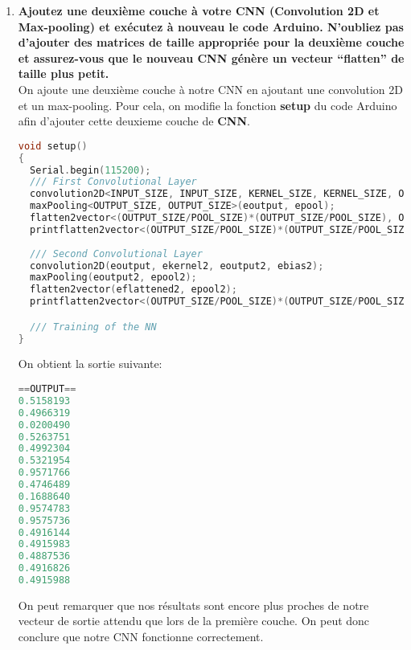 \begin{enumerate}
{\begin{lstlisting}[language=C]
0.4928572
0.5052462
0.4997209
    \end{lstlisting}
    On remarque imédiatement que l'on obtient des valeurs très proches de notre vecteur de sortie attendu. 
    On peut donc conclure que notre CNN fonctionne correctement.
  } \\
  \item {
    \textbf{Ajoutez une deuxième couche à votre CNN (Convolution 2D et Max-pooling) et
    exécutez à nouveau le code Arduino. N'oubliez pas d'ajouter des matrices de taille
    appropriée pour la deuxième couche et assurez-vous que le nouveau CNN génère un
    vecteur ``flatten'' de taille plus petit.} \vspace{0.2cm} \\
    On ajoute une deuxième couche à notre CNN en ajoutant une convolution 2D et un max-pooling. Pour cela,
    on modifie la fonction \textbf{setup} du code Arduino afin d'ajouter cette deuxieme couche de \textbf{CNN}.
    \begin{lstlisting}[language=C]
void setup()
{
  Serial.begin(115200);
  /// First Convolutional Layer
  convolution2D<INPUT_SIZE, INPUT_SIZE, KERNEL_SIZE, KERNEL_SIZE, OUTPUT_SIZE, OUTPUT_SIZE>(einput, ekernel, eoutput, ebias);
  maxPooling<OUTPUT_SIZE, OUTPUT_SIZE>(eoutput, epool);
  flatten2vector<(OUTPUT_SIZE/POOL_SIZE)*(OUTPUT_SIZE/POOL_SIZE), OUTPUT_SIZE/POOL_SIZE, OUTPUT_SIZE/POOL_SIZE>(eflattened, epool);
  printflatten2vector<(OUTPUT_SIZE/POOL_SIZE)*(OUTPUT_SIZE/POOL_SIZE)>(eflattened);
  
  /// Second Convolutional Layer
  convolution2D(eoutput, ekernel2, eoutput2, ebias2);
  maxPooling(eoutput2, epool2);
  flatten2vector(eflattened2, epool2);
  printflatten2vector<(OUTPUT_SIZE/POOL_SIZE)*(OUTPUT_SIZE/POOL_SIZE)>(eflattened2);

  /// Training of the NN
}
    \end{lstlisting}
    On obtient la sortie suivante:
    \begin{lstlisting}[language=C]
==OUTPUT==
0.5158193
0.4966319
0.0200490
0.5263751
0.4992304
0.5321954
0.9571766
0.4746489
0.1688640
0.9574783
0.9575736
0.4916144
0.4915983
0.4887536
0.4916826
0.4915988
    \end{lstlisting}
    On peut remarquer que nos résultats sont encore plus proches de notre vecteur de sortie attendu que lors de la première couche. 
    On peut donc conclure que notre CNN fonctionne correctement.
  }

\end{enumerate}